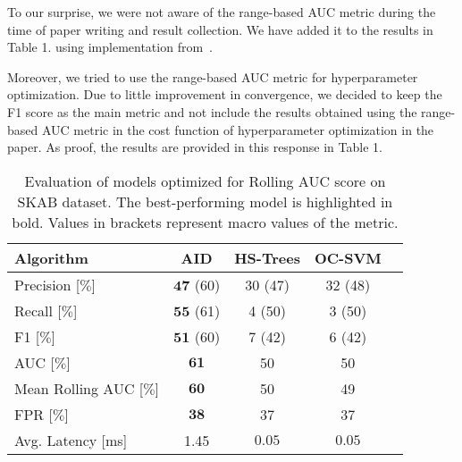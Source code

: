 \documentclass{article}
\begin{document}
\begin{enumerate}
        To our surprise, we were not aware of the range-based AUC metric during the time of paper writing and result collection. We have added it to the results in Table 1. using implementation from~\cite{Brzezinski2017}.

        Moreover, we tried to use the range-based AUC metric for hyperparameter optimization. Due to little improvement in convergence, we decided to keep the F1 score as the main metric and not include the results obtained using the range-based AUC metric in the cost function of hyperparameter optimization in the paper. As proof, the results are provided in this response in Table 1.


\end{enumerate}


\begin{table}[htbp]
  \caption{Evaluation of models optimized for Rolling AUC score on SKAB dataset. The best-performing model is highlighted in bold. Values in brackets represent macro values of the metric.}
  \begin{center}
    \label{tab:perf_comp_f1}
    \begin{tabular}{|l|c|c|c|c|}
      \hline
      \textbf{Algorithm}      & AID                    & HS-Trees            & OC-SVM              \\
      \hline
      Precision [$\%$]        & $\boldsymbol{47}$ (60) & 30 (47)             & 32 (48)             \\
      \hline
      Recall [$\%$]           & $\boldsymbol{55}$ (61) & 4 (50)              & 3 (50)              \\
      \hline
      F1 [$\%$]               & $\boldsymbol{51}$ (60) & 7 (42)              & 6 (42)              \\
      \hline
      AUC [$\%$]              & $\boldsymbol{61}$      & 50                  & 50                  \\
      \hline
      Mean Rolling AUC [$\%$] & $\boldsymbol{60}$      & 50                  & 49                  \\
      \hline
      FPR [$\%$]              & $\boldsymbol{38}$      & 37                  & 37                  \\
      \hline
      Avg. Latency [ms]       & 1.45                   & $\boldsymbol{0.05}$ & $\boldsymbol{0.05}$ \\
      \hline
    \end{tabular}
  \end{center}
\end{table}
\end{document}
